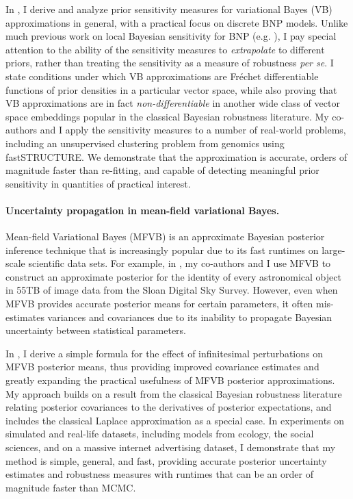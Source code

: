 In \citet{giordano:2021:bnpsensitivity}, I derive and analyze prior sensitivity
measures for variational Bayes (VB) approximations in general, with a practical
focus on discrete BNP models. Unlike much previous work on local Bayesian
sensitivity for BNP (e.g. \citet{Basu:2000:BNP_robustness}), I pay special
attention to the ability of the sensitivity measures to \emph{extrapolate} to
different priors, rather than treating the sensitivity as a measure of
robustness \textit{per se}.  I state conditions under which VB approximations
are Fr{\'e}chet differentiable functions of prior densities in a particular
vector space, while also proving that VB approximations are in fact
\emph{non-differentiable} in another wide class of vector space embeddings
popular in the classical Bayesian robustness literature.
My co-authors and I apply the sensitivity measures to a number of real-world
problems, including an unsupervised clustering problem from genomics using
fastSTRUCTURE.  We demonstrate that the approximation is accurate, orders of
magnitude faster than re-fitting, and capable of detecting meaningful prior
sensitivity in quantities of practical interest.



\paragraph{Uncertainty propagation in mean-field variational Bayes.}
%
Mean-field Variational Bayes (MFVB) is an approximate Bayesian posterior
inference technique that is increasingly popular due to its fast runtimes on
large-scale scientific data sets. For example, in
\citet{regier:2019:cataloging}, my co-authors and I use MFVB to construct an
approximate posterior for the identity of every astronomical object in 55TB
of image data from the Sloan Digital Sky Survey.  However, even when MFVB provides
accurate posterior means for certain parameters, it often mis-estimates
variances and covariances due to its inability to propagate Bayesian uncertainty
between statistical parameters.

In \citet{giordano:2015:linear, giordano:2018:covariances}, I derive a simple
formula for the effect of infinitesimal perturbations on MFVB posterior means,
thus providing improved covariance estimates and greatly expanding the practical
usefulness of MFVB posterior approximations. My approach builds on a result from
the classical Bayesian robustness literature relating posterior covariances to
the derivatives of posterior expectations, and includes the classical Laplace
approximation as a special case. In experiments on simulated and real-life
datasets,  including models from ecology, the social sciences, and on a massive
internet advertising dataset, I demonstrate that my method is simple, general,
and fast, providing accurate posterior uncertainty estimates and robustness
measures with runtimes that can be an order of magnitude faster than MCMC.

